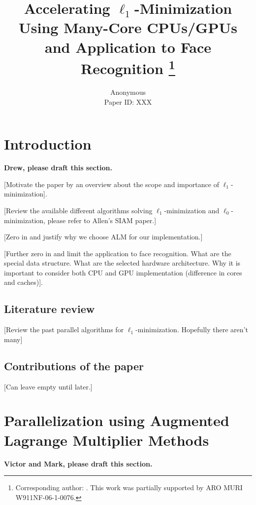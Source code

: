 \documentclass[times, 10pt,twocolumn, conference]{article}
\begin{document}
\twocolumn

\title{Accelerating $\ell_1$-Minimization Using Many-Core CPUs/GPUs \\ and Application to Face Recognition
\thanks{Corresponding author: . This work was partially supported by ARO MURI W911NF-06-1-0076.}}

\author{Anonymous\\
Paper ID: XXX
}

\maketitle
\begin{abstract}

\end{abstract}

\section{Introduction}
\label{sec:introduction}
{\bf Drew, please draft this section.}

[Motivate the paper by an overview about the scope and importance of $\ell_1$-minimization].

[Review the available different algorithms solving $\ell_1$-minimization and $\ell_0$-minimization, please refer to Allen's SIAM paper.]

[Zero in and justify why we choose ALM for our implementation.]

[Further zero in and limit the application to face recognition. What are the special data structure. What are the selected hardware architecture. Why it is important to consider both CPU and GPU implementation (difference in cores and caches)].

\subsection{Literature review}
[Review the past parallel algorithms for $\ell_1$-minimization. Hopefully there aren't many]

\subsection{Contributions of the paper}
[Can leave empty until later.]

\section{Parallelization using Augmented Lagrange Multiplier Methods}
{\bf Victor and Mark, please draft this section.}
\end{document}

